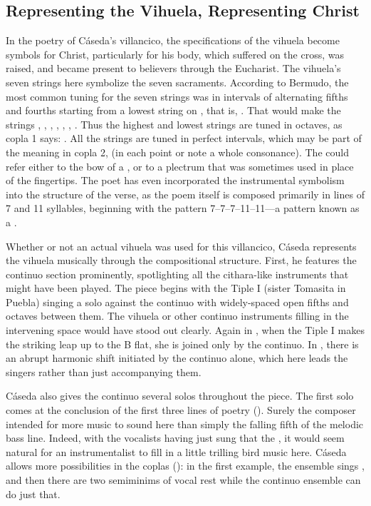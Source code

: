 \subsection{Representing the Vihuela, Representing Christ}

In the poetry of Cáseda's villancico, the specifications of the vihuela become
symbols for Christ, particularly for his body, which suffered on the cross, was
raised, and became present to believers through the Eucharist.
The vihuela's seven strings here symbolize the seven sacraments.
According to Bermudo, the most common tuning for the seven strings was in
intervals of alternating fifths and fourths starting from a lowest string on 
, that is, .%
    \Autocite[109r--109v]{Bermudo:Declaracion}
That would make the strings , , ,
, , , .
Thus the highest and lowest strings are tuned in octaves, as copla 1 says:
.
All the strings are tuned in perfect intervals, which may be part of the
meaning in copla 2,  (in each point or
note a whole consonance).
The  could refer either to the bow of a , or
to a plectrum that was sometimes used in place of the fingertips.
The poet has even incorporated the instrumental symbolism into the structure of
the verse, as the poem itself is composed primarily in lines of 7 and 11
syllables, beginning with the pattern 7--7--7--11--11---a pattern known as a
.%
    \Autocite{Lauer:Metrification}

Whether or not an actual vihuela was used for this villancico, Cáseda
represents the vihuela musically through the compositional structure.
First, he features the continuo section prominently, spotlighting all the
cithara-like instruments that might have been played.
The piece begins with the Tiple I (sister Tomasita in Puebla) singing a solo
against the continuo with widely-spaced open fifths and octaves between them.
The vihuela or other continuo instruments filling in the intervening space
would have stood out clearly.
Again in , when the Tiple I makes the striking leap up to the
B flat, she is joined only by the continuo.
In , there is an abrupt harmonic shift initiated by the continuo
alone, which here leads the singers rather than just accompanying them.

Cáseda also gives the continuo several solos throughout the piece.
The first solo comes at the conclusion of the first three lines of poetry
().
Surely the composer intended for more music to sound here than simply the
falling fifth of the melodic bass line.
Indeed, with the vocalists having just sung that the , it would seem natural for an instrumentalist
to fill in a little trilling bird music here.
Cáseda allows more possibilities in the coplas (): in the first example, the ensemble sings , and then there are two semiminims of vocal rest while the
continuo ensemble can do just that.


